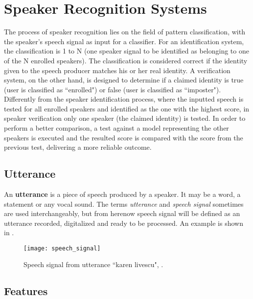 \chapter{Speaker Recognition Systems}
\label{ch:speaker-recognition-systems}


The process of speaker recognition lies on the field of pattern classification, with the speaker's speech signal as input for a classifier. For an identification system, the classification is 1 to N (one speaker signal to be identified as belonging to one of the N enrolled speakers). The classification is considered correct if the identity given to the speech producer matches his or her real identity. A verification system, on the other hand, is designed to determine if a claimed identity is true (user is classified as ``enrolled") or false (user is classified as ``imposter"). Differently from the speaker identification process, where the inputted speech is tested for all enrolled speakers and identified as the one with the highest score, in speaker verification only one speaker (the claimed identity) is tested. In order to perform a better comparison, a test against a model representing the other speakers is executed and the resulted score is compared with the score from the previous test, delivering a more reliable outcome.

\section{Utterance}

An \textbf{utterance} is a piece of speech produced by a speaker. It may be a word, a statement or any vocal sound. The terms \emph{utterance} and \emph{speech signal} sometimes are used interchangeably, but from herenow speech signal will be defined as an utterance recorded, digitalized and ready to be processed. An example is shown in .

\begin{figure}[ht]
    \centering
    \texttt{[image: speech\_signal]}
    \caption{Speech signal from utterance ``karen livescu", .}
    \label{fig:speech_signal}
\end{figure}

\section{Features}

